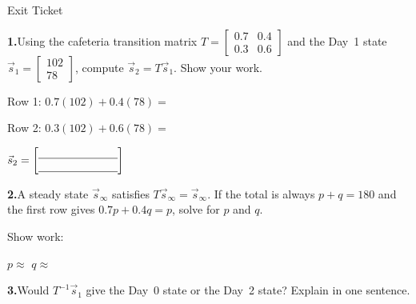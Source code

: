 \documentclass[10pt]{article}
\begin{document}
\namedateperiod

\vspace{0.12in}

\begin{notesbox}{Exit Ticket}

\textbf{1.}\quad Using the cafeteria transition matrix $T = \begin{bmatrix}0.7&0.4\\0.3&0.6\end{bmatrix}$
and the Day~1 state $\vec{s}_1 = \begin{bmatrix}102\\78\end{bmatrix}$,
compute $\vec{s}_2 = T\vec{s}_1$. Show your work.

\vspace{6pt}
Row 1: $0.7(102)+0.4(78) = $ \blank{4cm}

\vspace{4pt}
Row 2: $0.3(102)+0.6(78) = $ \blank{4cm}

\vspace{6pt}
$\vec{s}_2 = \begin{bmatrix}\blank{2.5cm} \\ \blank{2.5cm}\end{bmatrix}$

\vspace{14pt}
\textbf{2.}\quad A steady state $\vec{s}_\infty$ satisfies $T\vec{s}_\infty = \vec{s}_\infty$.
If the total is always $p + q = 180$ and the first row gives $0.7p + 0.4q = p$,
solve for $p$ and $q$.

\vspace{4pt}
Show work:


$p \approx $ \blank{3cm} \qquad $q \approx $ \blank{3cm}

\vspace{10pt}
\textbf{3.}\quad Would $T^{-1}\vec{s}_1$ give the Day~0 state or the Day~2 state?
Explain in one sentence.

\vspace{4pt}
\writeline

\end{notesbox}
\end{document}
